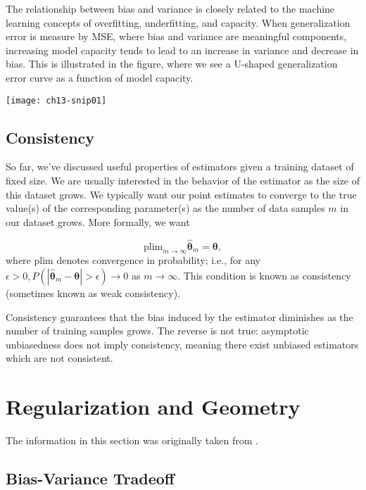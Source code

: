 The relationship between bias and variance is closely related to the machine learning concepts of overfitting, underfitting, and capacity. When generalization error is measure by \ac{MSE}, where bias and variance are meaningful components, increasing model capacity tends to lead to an increase in variance and decrease in bias. This is illustrated in the figure, where we see a U-shaped generalization error curve as a function of model capacity.
\begin{marginfigure}
\texttt{[image: ch13-snip01]}
\end{marginfigure}



\subsection{Consistency}

So far, we've discussed useful properties of estimators given a training dataset of fixed size. We are usually interested in the behavior of the estimator as the size of this dataset grows. We typically want our point estimates to converge to the true value(s) of the corresponding parameter(s) as the number of data samples $m$ in our dataset grows. More formally, we want

\begin{equation}
\text{plim}_{m \rightarrow \infty} \boldsymbol{\hat\theta}_m = \boldsymbol{\theta},
\end{equation}
where $\text{plim}$ denotes convergence in probability; i.e., for any $\epsilon > 0, P(|\boldsymbol{\hat\theta}_m - \boldsymbol{\theta}| > \epsilon) \rightarrow 0$ as $m \rightarrow \infty$. This condition is known as consistency (sometimes known as weak consistency).

Consistency guarantees that the bias induced by the estimator diminishes as the number of training samples grows. The reverse is not true: asymptotic unbiasedness does not imply consistency, meaning there exist unbiased estimators which are not consistent.


\clearpage
\section{Regularization and Geometry}

The information in this section was originally taken from \cite{MinhPham2019,AnujaNagpal2017}.

\subsection{Bias-Variance Tradeoff}

